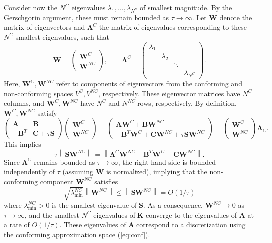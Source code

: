 \documentclass[preprint,10pt]{elsarticle}
\newcommand{\nor}[1]{\left\| #1 \right\|}
\newcommand{\LRp}[1]{\left( #1 \right)}
\newcommand{\note}[1]{#1}
\begin{document}
Consider now the $N^C$ eigenvalues \note{ $\lambda_1, \ldots, \lambda_{N^C}$} of smallest magnitude.  By the Gerschgorin argument, these must remain bounded as $\tau \rightarrow \infty$.  \note{Let $\bm{W}$ denote the matrix of eigenvectors and $\bm{\Lambda}^C$ the matrix of eigenvalues corresponding to these $N^C$ smallest eigenvalues, such that
\[
\bm{W} = \LRp{\begin{array}{c}
\bm{W}^C\\
\bm{W}^{NC}
\end{array}}, \qquad 
\bm{\Lambda}^C = \LRp{\begin{array}{cccc}
\lambda_1 & & &\\
& \lambda_2 & &\\
& & \ddots &\\
& & & \lambda_{N^C}
\end{array}
}.
 \]
Here, $\bm{W}^C, \bm{W}^{NC}$ refer to components of eigenvectors from the conforming and non-conforming spaces $V^C, V^{NC}$, respectively.  These eigenvector matrices have $N^C$ columns, and $\bm{W}^C, \bm{W}^{NC}$ have $N^{C}$ and $N^{NC}$ rows, respectively.  By definition, $\bm{W}^C, \bm{W}^{NC}$ satisfy}
\[
\left(\begin{array}{cc}
\bm{A} & \bm{B}\\
-\bm{B}^T & \bm{C} + \tau \bm{S}
\end{array}\right)
\left(\begin{array}{c}
\bm{W}^C
\\
\bm{W}^{NC}
\end{array}\right) = 
\left(\begin{array}{c}
\bm{A}\bm{W}^C + \bm{B}\bm{W}^{NC}\\
-\bm{B}^T\bm{W}^C + \bm{C}\bm{W}^{NC} + \tau \bm{S}\bm{W}^{NC}
\end{array}\right)
= 
\left(\begin{array}{c}
\bm{W}^C
\\
\bm{W}^{NC}
\end{array}\right) 
\note{\bm{\Lambda}_C}.
\]
This implies 
\[
\tau \nor{\bm{S}\bm{W}^{NC}} = \nor{\bm{\Lambda}^C \bm{W}^{NC} + \bm{B}^T\bm{W}^C  - \bm{C}\bm{W}^{NC}}.
\]
Since $\bm{\Lambda}^C$ remains bounded as $\tau\rightarrow \infty$, the right hand side is bounded independently of $\tau$ \note{(assuming $\bm{W}$ is normalized)}, implying that the non-conforming component $\bm{W}^{NC}$ satisfies
\[
\sqrt{\lambda^{NC}_{\min}}\nor{\bm{W}^{NC}} \leq \nor{\bm{S}\bm{W}^{NC}} = O(1/\tau)
\]
where $\lambda^{NC}_{\min} > 0$ is the smallest eigenvalue of $\bm{S}$.  As a consequence, $\bm{W}^{NC} \rightarrow 0$ as $\tau\rightarrow \infty$, and the smallest $N^C$ eigenvalues of $\bm{K}$ converge to the eigenvalues of $\bm{A}$ at a rate of $O(1/\tau)$.  These eigenvalues of $\bm{A}$ correspond to a discretization using the conforming approximation space (\ref{eq:conf}). 
\end{document}
